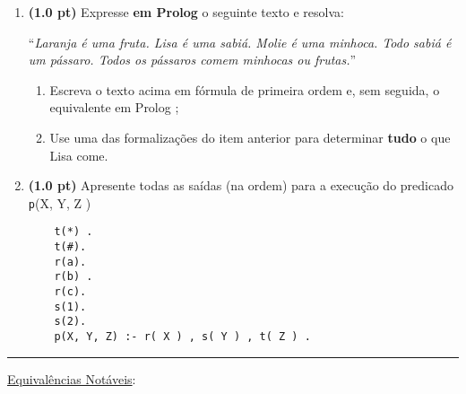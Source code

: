 \documentclass[11pt, a4paper,final]{article}
\begin{document}
\begin{enumerate}
\item {\bf (1.0 pt)} Expresse {\bf em Prolog} o seguinte texto e resolva: 


``\textit{Laranja é uma fruta. Lisa é uma sabiá. Molie é uma minhoca. Todo sabiá é um pássaro. Todos os pássaros comem minhocas ou frutas.}''

\begin{enumerate}
  \item Escreva o texto acima em fórmula de primeira ordem e, sem seguida, o equivalente em Prolog ;
  \item Use uma das formalizações do item anterior para determinar {\bf tudo} o que Lisa come.
\end{enumerate}

\item {\bf (1.0 pt)} Apresente todas as saídas (na ordem) para a execução do predicado {\texttt p(X, Y, Z )}

\begin{verbatim}
	t(*) .
	t(#).
	r(a).
	r(b) .
	r(c).
	s(1).
	s(2).
	p(X, Y, Z) :- r( X ) , s( Y ) , t( Z ) .
\end{verbatim}



\end{enumerate}


\noindent\rule{0.8\textwidth}{2pt}



\underline{{\large Equivalências Notáveis}}:
\end{document}
